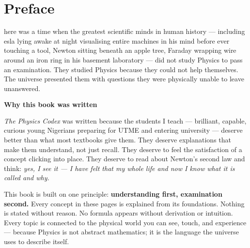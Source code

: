 
\chapter*{Preface}


here was a time when the greatest scientific minds 
in human history --- including \newline{}esla lying awake at night 
visualising entire machines in his mind before ever touching 
a tool, Newton sitting beneath an apple tree, Faraday wrapping 
wire around an iron ring in his basement laboratory --- did not 
study Physics to pass an examination. They studied Physics 
because they could not help themselves. The universe presented 
them with questions they were physically unable to leave 
unanswered.

\vspace{0.5cm}

\textbf{Why this book was written}

\vspace{0.3cm}

\textit{The Physics Codex} was written because the students I
teach --- brilliant, capable, curious young Nigerians preparing
for UTME and entering university --- deserve better than what
most textbooks give them. They deserve explanations that make
them understand, not just recall. They deserve to feel the
satisfaction of a concept clicking into place. They deserve to
read about Newton's second law and think: \textit{yes, I see
it --- I have felt that my whole life and now I know what it
is called and why.}

This book is built on one principle: \textbf{understanding
first, examination second.} Every concept in these pages is
explained from its foundations. Nothing is stated without
reason. No formula appears without derivation or intuition.
Every topic is connected to the physical world you can see,
touch, and experience --- because Physics is not abstract
mathematics; it is the language the universe uses to describe
itself.

\vspace{0.5cm}

